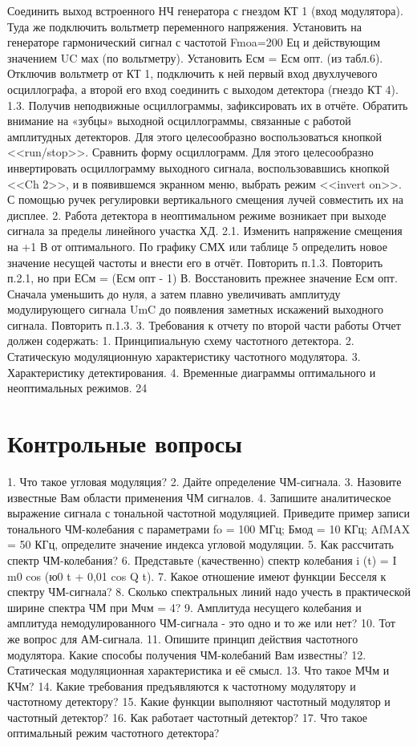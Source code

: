 ﻿\documentclass[a4paper,12pt]{article}
\begin{document}
Соединить выход встроенного НЧ генератора с гнездом КТ 1 (вход модулятора). Туда же подключить вольтметр переменного напряжения. Установить на генераторе гармонический сигнал с частотой Fmoa=200 Ец и действующим значением UC мах (по вольтметру). Установить Есм = Есм опт. (из табл.6). Отключив вольтметр от КТ 1, подключить к ней первый вход двухлучевого осциллографа, а второй его вход соединить с выходом детектора (гнездо КТ 4).
1.3.	Получив неподвижные осциллограммы, зафиксировать их в отчёте. Обратить внимание на «зубцы» выходной осциллограммы, связанные с работой амплитудных детекторов. Для этого целесообразно воспользоваться кнопкой <<run/stop>>. Сравнить форму осциллограмм. Для этого целесообразно инвертировать осциллограмму выходного сигнала, воспользовавшись кнопкой <<Ch 2>>, и в появившемся экранном меню, выбрать режим <<invert on>>. С помощью ручек регулировки вертикального смещения лучей совместить их на дисплее.
2.	Работа детектора в неоптимальном режиме возникает при выходе сигнала за пределы линейного участка ХД.
2.1.	Изменить напряжение смещения на +1 В от оптимального. По графику СМХ или таблице 5 определить новое значение несущей частоты и внести его в отчёт. Повторить п.1.3.
Повторить п.2.1, но при ЕСм = (Есм опт - 1) В.
Восстановить прежнее значение Есм опт. Сначала уменьшить до нуля, а затем плавно увеличивать амплитуду модулирующего сигнала UmC до появления заметных искажений выходного сигнала.
Повторить п.1.3.
3.	Требования к отчету по второй части работы
Отчет должен содержать:
1.	Принципиальную схему частотного детектора.
2.	Статическую модуляционную характеристику частотного модулятора.
3.	Характеристику детектирования.
4.	Временные диаграммы оптимального и неоптимальных режимов.
24

\section{Контрольные вопросы}
1.	Что такое угловая модуляция?
2.	Дайте определение ЧМ-сигнала.
3.	Назовите известные Вам области применения ЧМ сигналов.
4.	Запишите аналитическое выражение сигнала с тональной частотной модуляцией. Приведите пример записи тонального ЧМ-колебания с параметрами fo = 100 МГц; Бмод = 10 КГц; AfMAX = 50 КГц, определите значение индекса угловой модуляции.
5.	Как рассчитать спектр ЧМ-колебания?
6.	Представьте (качественно) спектр колебания i (t) = I m0 cos (ю0 t + 0,01 cos Q t).
7.	Какое отношение имеют функции Бесселя к спектру ЧМ-сигнала?
8.	Сколько спектральных линий надо учесть в практической ширине спектра ЧМ при Мчм = 4?
9.	Амплитуда несущего колебания и амплитуда немодулированного ЧМ-сигнала - это одно и то же или нет?
10.	Тот же вопрос для АМ-сигнала.
11.	Опишите принцип действия частотного модулятора. Какие способы получения ЧМ-колебаний Вам известны?
12.	Статическая модуляционная характеристика и её смысл.
13.	Что такое МЧм и КЧм?
14.	Какие требования предъявляются к частотному модулятору и частотному детектору?
15.	Какие функции выполняют частотный модулятор и частотный детектор?
16.	Как работает частотный детектор?
17.	Что такое оптимальный режим частотного детектора?
\end{document}
